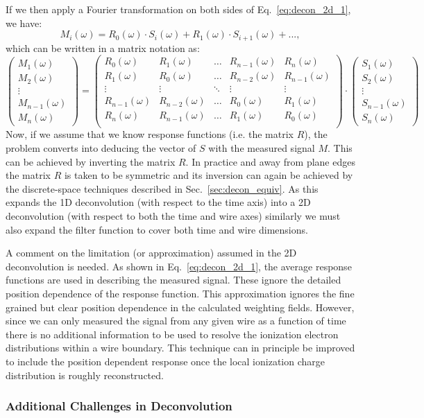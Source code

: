 If we then apply a Fourier transformation on both sides of Eq.~\ref{eq:decon_2d_1},
we have:
\begin{equation}\label{eq:decon_2d_2}
M_i(\omega) = R_0(\omega) \cdot S_i(\omega) + R_1(\omega) \cdot S_{i+1} (\omega) + ...,
\end{equation} 
which can be written in a matrix notation as:
\begin{equation}
\begin{pmatrix}
    M_1(\omega)\\
    M_2(\omega)\\
    \vdots\\
    M_{n-1}(\omega)\\
    M_{n}(\omega)
\end{pmatrix}
=
\begin{pmatrix}
R_0(\omega) & R_1(\omega) & \ldots & R_{n-1}(\omega) & R_n(\omega) \\
R_1(\omega) & R_0(\omega) & \ldots & R_{n-2}(\omega) & R_{n-1}(\omega) \\
    \vdots  & \vdots      & \ddots & \vdots          & \vdots \\
    R_{n-1}(\omega) & R_{n-2}(\omega) & \ldots & R_0(\omega) & R_1(\omega) \\
    R_{n}(\omega) & R_{n-1}(\omega) & \ldots & R_1(\omega) & R_0(\omega) \\
\end{pmatrix}
\cdot
\begin{pmatrix}
    S_1(\omega)\\
    S_2(\omega)\\
    \vdots\\
    S_{n-1}(\omega)\\
    S_{n}(\omega)
\end{pmatrix}
\label{eq:matrix_expansion}
\end{equation}
Now, if we assume that we know response functions (i.e. the matrix $R$), the 
problem converts into deducing the vector of $S$ with the measured signal $M$. 
%
This can be achieved by inverting the matrix $R$. In practice and away
from plane edges the matrix $R$ is taken to be symmetric and its
inversion can again be achieved by the discrete-space techniques
described in Sec.~\ref{sec:decon_equiv}.
%
As this expands the 1D deconvolution (with respect to the time axis)
into a 2D deconvolution (with respect to both the time and wire
axes) similarly we must also expand the filter function to cover
both time and wire dimensions.

A comment on the limitation (or approximation) 
assumed in the 2D deconvolution is needed. As shown in Eq.~\ref{eq:decon_2d_1}, the 
average response functions are used in describing the measured signal. These 
ignore the detailed position dependence of the response function. 
This approximation ignores the fine grained but clear position
dependence in the calculated weighting fields.
However, since we can only measured the signal from any given wire as
a function of time there is no additional information to be used to
resolve the ionization electron distributions within a wire boundary.
This technique can in principle be improved to include the position dependent
response once the local ionization charge distribution is roughly reconstructed. 

\subsubsection{Additional Challenges in Deconvolution}
